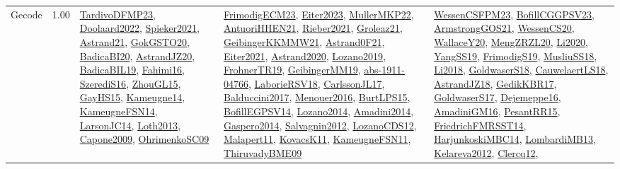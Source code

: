 {\begin{longtable}{p{3cm}r>{\raggedright\arraybackslash}p{6cm}>{\raggedright\arraybackslash}p{6cm}>{\raggedright\arraybackslash}p{8cm}}
\index{Gecode}\index{CPSystems!Gecode}Gecode &  1.00 & \hyperref[detail:TardivoDFMP23]{TardivoDFMP23}, \hyperref[detail:Doolaard2022]{Doolaard2022}, \hyperref[detail:Spieker2021]{Spieker2021}, \hyperref[detail:Astrand21]{Astrand21}, \hyperref[detail:GokGSTO20]{GokGSTO20}, \hyperref[detail:BadicaBI20]{BadicaBI20}, \hyperref[detail:AstrandJZ20]{AstrandJZ20}, \hyperref[detail:BadicaBIL19]{BadicaBIL19}, \hyperref[detail:Fahimi16]{Fahimi16}, \hyperref[detail:SzerediS16]{SzerediS16}, \hyperref[detail:ZhouGL15]{ZhouGL15}, \hyperref[detail:GayHS15]{GayHS15}, \hyperref[detail:Kameugne14]{Kameugne14}, \hyperref[detail:KameugneFSN14]{KameugneFSN14}, \hyperref[detail:LarsonJC14]{LarsonJC14}, \hyperref[detail:Loth2013]{Loth2013}, \hyperref[detail:Capone2009]{Capone2009}, \hyperref[detail:OhrimenkoSC09]{OhrimenkoSC09} & \hyperref[detail:FrimodigECM23]{FrimodigECM23}, \hyperref[detail:Eiter2023]{Eiter2023}, \hyperref[detail:MullerMKP22]{MullerMKP22}, \hyperref[detail:AntuoriHHEN21]{AntuoriHHEN21}, \hyperref[detail:Rieber2021]{Rieber2021}, \hyperref[detail:Groleaz21]{Groleaz21}, \hyperref[detail:GeibingerKKMMW21]{GeibingerKKMMW21}, \hyperref[detail:Astrand0F21]{Astrand0F21}, \hyperref[detail:Eiter2021]{Eiter2021}, \hyperref[detail:Astrand2020]{Astrand2020}, \hyperref[detail:Lozano2019]{Lozano2019}, \hyperref[detail:FrohnerTR19]{FrohnerTR19}, \hyperref[detail:GeibingerMM19]{GeibingerMM19}, \hyperref[detail:abs-1911-04766]{abs-1911-04766}, \hyperref[detail:LaborieRSV18]{LaborieRSV18}, \hyperref[detail:CarlssonJL17]{CarlssonJL17}, \hyperref[detail:Balduccini2017]{Balduccini2017}, \hyperref[detail:Menouer2016]{Menouer2016}, \hyperref[detail:BurtLPS15]{BurtLPS15}, \hyperref[detail:BofillEGPSV14]{BofillEGPSV14}, \hyperref[detail:Lozano2014]{Lozano2014}, \hyperref[detail:Amadini2014]{Amadini2014}, \hyperref[detail:Gaspero2014]{Gaspero2014}, \hyperref[detail:Salvagnin2012]{Salvagnin2012}, \hyperref[detail:LozanoCDS12]{LozanoCDS12}, \hyperref[detail:Malapert11]{Malapert11}, \hyperref[detail:KovacsK11]{KovacsK11}, \hyperref[detail:KameugneFSN11]{KameugneFSN11}, \hyperref[detail:ThiruvadyBME09]{ThiruvadyBME09} & \hyperref[detail:WessenCSFPM23]{WessenCSFPM23}, \hyperref[detail:BofillCGGPSV23]{BofillCGGPSV23}, \hyperref[detail:ArmstrongGOS21]{ArmstrongGOS21}, \hyperref[detail:WessenCS20]{WessenCS20}, \hyperref[detail:WallaceY20]{WallaceY20}, \hyperref[detail:MengZRZL20]{MengZRZL20}, \hyperref[detail:Li2020]{Li2020}, \hyperref[detail:YangSS19]{YangSS19}, \hyperref[detail:FrimodigS19]{FrimodigS19}, \hyperref[detail:MusliuSS18]{MusliuSS18}, \hyperref[detail:Li2018]{Li2018}, \hyperref[detail:GoldwaserS18]{GoldwaserS18}, \hyperref[detail:CauwelaertLS18]{CauwelaertLS18}, \hyperref[detail:AstrandJZ18]{AstrandJZ18}, \hyperref[detail:GedikKBR17]{GedikKBR17}, \hyperref[detail:GoldwaserS17]{GoldwaserS17}, \hyperref[detail:Dejemeppe16]{Dejemeppe16}, \hyperref[detail:AmadiniGM16]{AmadiniGM16}, \hyperref[detail:PesantRR15]{PesantRR15}, \hyperref[detail:FriedrichFMRSST14]{FriedrichFMRSST14}, \hyperref[detail:HarjunkoskiMBC14]{HarjunkoskiMBC14}, \hyperref[detail:LombardiMB13]{LombardiMB13}, \hyperref[detail:Kelareva2012]{Kelareva2012}, \hyperref[detail:Clercq12]{Clercq12}, 
\end{longtable}}
